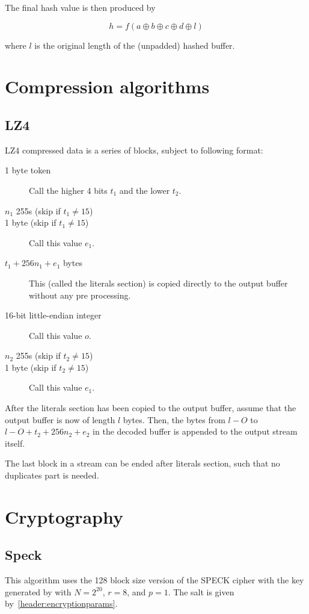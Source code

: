\documentclass[11pt,a4paper]{report}
\begin{document}
        The final hash value is then produced by

        $$h = f(a \oplus b \oplus c \oplus d \oplus l) $$

        where $l$ is the original length of the (unpadded) hashed buffer.

    \section{Compression algorithms}
        \subsection{LZ4}
        \label{algorithm:lz4}
        LZ4 compressed data is a series of blocks, subject to following format:

        \begin{description}
            \item [1 byte token] Call the higher 4 bits $t_1$ and the lower $t_2$.
            \item [$n_1$ 255s (skip if $t_1 \neq 15$)]
            \item [1 byte (skip if $t_1 \neq 15$)] Call this value $e_1$.
            \item [$t_1 + 256n_1 + e_1$ bytes] This (called the literals
                section) is copied directly to the output buffer without any
                pre processing.
            \item [16-bit little-endian integer] Call this value $o$.
            \item [$n_2$ 255s (skip if $t_2 \neq 15$)]
            \item [1 byte (skip if $t_2 \neq 15$)] Call this value $e_1$.
        \end{description}

        After the literals section has been copied to the output buffer, assume
        that the output buffer is now of length $l$ bytes. Then, the bytes from
        $l - O$ to $l - O + t_2 + 256n_2 + e_2$ in the decoded buffer is
        appended to the output stream itself.

        The last block in a stream can be ended after literals section, such
        that no duplicates part is needed.

    \section{Cryptography}
        \subsection{Speck}
        \label{algorithm:speck}
        This algorithm uses the 128 block size version of the SPECK
        cipher\cite{speck} with the key generated by \cite{scrypt} with $N =
        2^{20}$, $r = 8$, and $p = 1$. The salt is given
        by~\ref{header:encryptionparams}.
\end{document}
